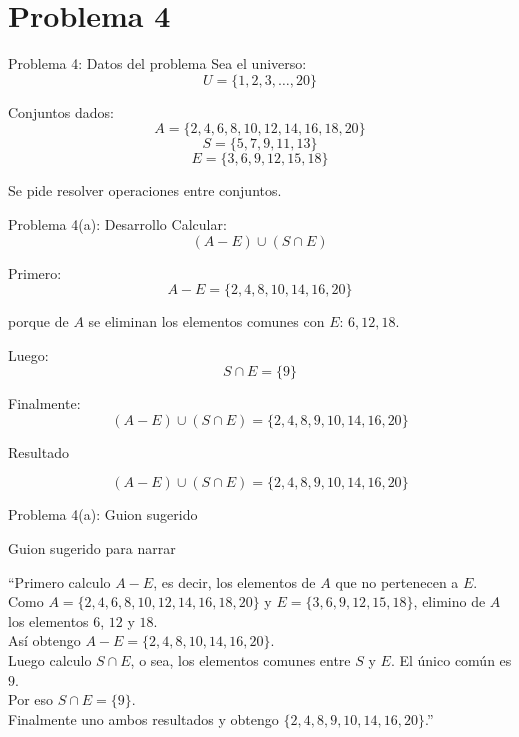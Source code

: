 \documentclass[aspectratio=169,10pt]{beamer}
\newcommand{\Guion}[1]{
	\begin{exampleblock}{Guion sugerido para narrar}
		#1
	\end{exampleblock}
}
\newcommand{\Resultado}[1]{
	\begin{block}{Resultado}
		#1
	\end{block}
}
\begin{document}
	\section{Problema 4}
	
	\begin{frame}{Problema 4: Datos del problema}
		Sea el universo:
		\[
		U=\{1,2,3,\dots,20\}
		\]
		
		Conjuntos dados:
		\[
		A=\{2,4,6,8,10,12,14,16,18,20\}
		\]
		\[
		S=\{5,7,9,11,13\}
		\]
		\[
		E=\{3,6,9,12,15,18\}
		\]
		
		Se pide resolver operaciones entre conjuntos.
	\end{frame}
	
	\begin{frame}{Problema 4(a): Desarrollo}
		Calcular:
		\[
		(A-E)\cup (S\cap E)
		\]
		
		Primero:
		\[
		A-E=\{2,4,8,10,14,16,20\}
		\]
		
		porque de \(A\) se eliminan los elementos comunes con \(E\): \(6,12,18\).
		
		Luego:
		\[
		S\cap E=\{9\}
		\]
		
		Finalmente:
		\[
		(A-E)\cup (S\cap E)=\{2,4,8,9,10,14,16,20\}
		\]
		
		\Resultado{
			\[
			(A-E)\cup (S\cap E)=\{2,4,8,9,10,14,16,20\}
			\]
		}
	\end{frame}
	
	\begin{frame}{Problema 4(a): Guion sugerido}
		\Guion{
			``Primero calculo \(A-E\), es decir, los elementos de \(A\) que no pertenecen a \(E\).\\
			Como \(A=\{2,4,6,8,10,12,14,16,18,20\}\) y \(E=\{3,6,9,12,15,18\}\), elimino de \(A\) los elementos \(6\), \(12\) y \(18\).\\
			Así obtengo \(A-E=\{2,4,8,10,14,16,20\}\).\\[0.2cm]
			Luego calculo \(S\cap E\), o sea, los elementos comunes entre \(S\) y \(E\). El único común es \(9\).\\
			Por eso \(S\cap E=\{9\}\).\\[0.2cm]
			Finalmente uno ambos resultados y obtengo \(\{2,4,8,9,10,14,16,20\}\).''}
	\end{frame}
	
\end{document}
